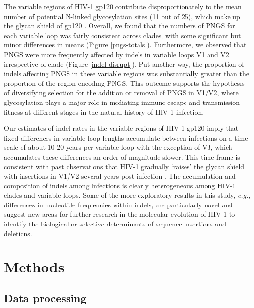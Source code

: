 \documentclass[12pt]{article}
\begin{document}
The variable regions of HIV-1 gp120 contribute disproportionately to the mean number of potential N-linked glycosylation sites (11 out of 25), which make up the glycan shield of gp120 \citep{Zhu:2000}. 
Overall, we found that the numbers of PNGS for each variable loop was fairly consistent across clades, with some significant but minor differences in means (Figure \ref{pngs-totals}).
Furthermore, we observed that PNGS were more frequently affected by indels in variable loops V1 and V2 irrespective of clade (Figure \ref{indel-disrupt}).
Put another way, the proportion of indels affecting PNGS in these variable regions was substantially greater than the proportion of the region encoding PNGS.
This outcome supports the hypothesis of diversifying selection for the addition or removal of PNGS in V1/V2, where glycosylation plays a major role in mediating immune escape \citep{Sagar:2006} and transmission fitness \citep{Derdeyn:2004} at different stages in the natural history of HIV-1 infection.


Our estimates of indel rates in the variable regions of HIV-1 gp120 imply that fixed differences in variable loop lengths accumulate between infections on a time scale of about 10-20 years per variable loop with the exception of V3, which accumulates these differences an order of magnitude slower.
This time frame is consistent with past observations that HIV-1 gradually `raises' the glycan shield with insertions in V1/V2 several years post-infection \citep{Sagar:2006}.
The accumulation and composition of indels among infections is clearly heterogeneous among HIV-1 clades and variable loops.
Some of the more exploratory results in this study, \textit{e.g.}, differences in nucleotide frequencies within indels, are particularly novel and suggest new areas for further research in the molecular evolution of HIV-1 to identify the biological or selective determinants of sequence insertions and deletions.


\section * {Methods}


\subsection * {Data processing} 
\end{document}
